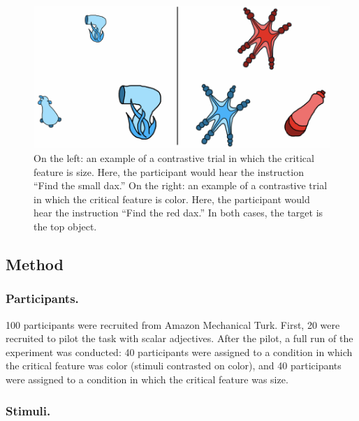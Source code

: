 \documentclass[10pt, letterpaper]{article}
\newenvironment{CodeChunk}{}{}
\begin{document}
\begin{CodeChunk}
\begin{figure}[H]

{\centering \includegraphics{figs/colortrial-1} 

}

\caption[On the left]{On the left: an example of a contrastive trial in which the critical feature is size. Here, the participant would hear the instruction ``Find the small dax.'' On the right: an example of a contrastive trial in which the critical feature is color. Here, the participant would hear the instruction ``Find the red dax.'' In both cases, the target is the top object.}\label{fig:colortrial}
\end{figure}
\end{CodeChunk}

\subsection{Method}\label{method}

\subsubsection{Participants.}\label{participants.}

100 participants were recruited from Amazon Mechanical Turk. First, 20
were recruited to pilot the task with scalar adjectives. After the
pilot, a full run of the experiment was conducted: 40 participants were
assigned to a condition in which the critical feature was color (stimuli
contrasted on color), and 40 participants were assigned to a condition
in which the critical feature was size.

\subsubsection{Stimuli.}\label{stimuli.}
\end{document}
